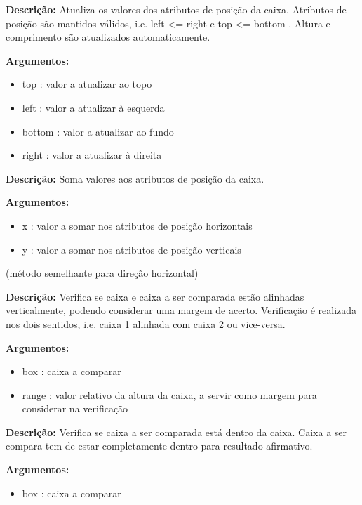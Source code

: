 
\textbf{Descrição:} Atualiza os valores dos atributos de posição da caixa. Atributos de posição são mantidos válidos, i.e. left <= right e top <= bottom . Altura e comprimento são atualizados automaticamente.

\textbf{Argumentos:}
\begin{itemize}\setlength\itemsep{-0.3em}
	\item top : valor a atualizar ao topo
	\item left : valor a atualizar à esquerda
	\item bottom : valor a atualizar ao fundo
	\item right : valor a atualizar à direita
\end{itemize}



\textbf{Descrição:} Soma valores aos atributos de posição da caixa.

\textbf{Argumentos:}
\begin{itemize}\setlength\itemsep{-0.3em}
	\item x : valor a somar nos atributos de posição horizontais
	\item y : valor a somar nos atributos de posição verticais
\end{itemize}

(método semelhante para direção horizontal)

\textbf{Descrição:} Verifica se caixa e caixa a ser comparada estão alinhadas verticalmente, podendo considerar uma margem de acerto. Verificação é realizada nos dois sentidos, i.e. caixa 1 alinhada com caixa 2 ou vice-versa.

\textbf{Argumentos:}
\begin{itemize}\setlength\itemsep{-0.3em}
	\item box : caixa a comparar
	\item range : valor relativo da altura da caixa, a servir como margem para considerar na verificação
\end{itemize}


\textbf{Descrição:} Verifica se caixa a ser comparada está dentro da caixa. Caixa a ser compara tem de estar completamente dentro para resultado afirmativo.

\textbf{Argumentos:}
\begin{itemize}\setlength\itemsep{-0.3em}
	\item box : caixa a comparar
\end{itemize}


